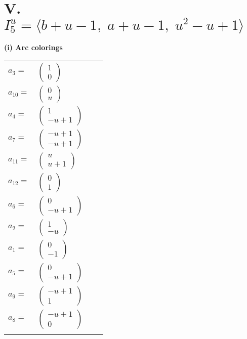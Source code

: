 \documentclass[1p]{elsarticle_modified}
\theoremstyle{definition}
\begin{document}
\centering \section*{V. $I^u_{5}= \langle b+u-1,\;a+u-1,\;u^2- u+1 \rangle$}
\flushleft \textbf{(i) Arc colorings}\\
\begin{tabular}{m{7pt} m{180pt} m{7pt} m{180pt} }
\flushright $a_{3}=$&$\begin{pmatrix}1\\0\end{pmatrix}$ \\
\flushright $a_{10}=$&$\begin{pmatrix}0\\u\end{pmatrix}$ \\
\flushright $a_{4}=$&$\begin{pmatrix}1\\- u+1\end{pmatrix}$ \\
\flushright $a_{7}=$&$\begin{pmatrix}- u+1\\- u+1\end{pmatrix}$ \\
\flushright $a_{11}=$&$\begin{pmatrix}u\\u+1\end{pmatrix}$ \\
\flushright $a_{12}=$&$\begin{pmatrix}0\\1\end{pmatrix}$ \\
\flushright $a_{6}=$&$\begin{pmatrix}0\\- u+1\end{pmatrix}$ \\
\flushright $a_{2}=$&$\begin{pmatrix}1\\- u\end{pmatrix}$ \\
\flushright $a_{1}=$&$\begin{pmatrix}0\\-1\end{pmatrix}$ \\
\flushright $a_{5}=$&$\begin{pmatrix}0\\- u+1\end{pmatrix}$ \\
\flushright $a_{9}=$&$\begin{pmatrix}- u+1\\1\end{pmatrix}$ \\
\flushright $a_{8}=$&$\begin{pmatrix}- u+1\\0\end{pmatrix}$\\&\end{tabular}
\end{document}
